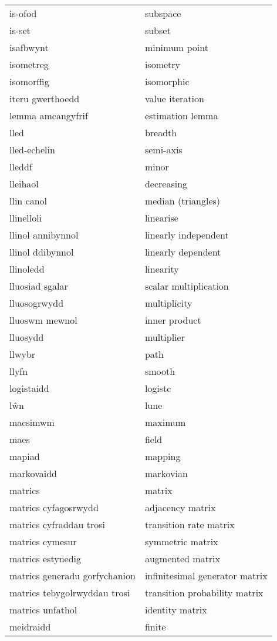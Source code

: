 \begin{supertabular}{p{0.22\textwidth}p{0.22\textwidth}}
is-ofod & subspace \\
is-set & subset \\
isafbwynt & minimum point \\
isometreg & isometry \\
isomorffig & isomorphic \\
iteru gwerthoedd & value iteration \\
lemma amcangyfrif & estimation lemma \\
lled & breadth \\
lled-echelin & semi-axis \\
lleddf & minor \\
lleihaol & decreasing \\
llin canol & median (triangles) \\
llinelloli & linearise \\
llinol annibynnol & linearly independent \\
llinol ddibynnol & linearly dependent \\
llinoledd & linearity \\
lluosiad sgalar & scalar multiplication \\
lluosogrwydd & multiplicity \\
lluoswm mewnol & inner product \\
lluosydd & multiplier \\
llwybr & path \\
llyfn & smooth \\
logistaidd & logistc \\
lŵn & lune \\
macsimwm & maximum \\
maes & field \\
mapiad & mapping \\
markovaidd & markovian \\
matrics & matrix \\
matrics cyfagosrwydd & adjacency matrix \\
matrics cyfraddau trosi & transition rate matrix \\
matrics cymesur & symmetric matrix \\
matrics estynedig & augmented matrix \\
matrics generadu gorfychanion & infinitesimal generator matrix \\
matrics tebygolrwyddau trosi & transition probability matrix \\
matrics unfathol & identity matrix \\
meidraidd & finite \\

\end{supertabular}
